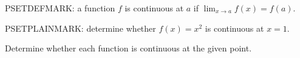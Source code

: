 \documentclass[
	pset-number = 3,
	pset-due    = {Friday, May 15, 2026},
]{pset}
\begin{document}
\maketitle

\begin{definition}[Continuity]
	PSETDEFMARK: a function $f$ is continuous at $a$ if
	$\lim_{x \to a} f(x) = f(a)$.
\end{definition}

\begin{problem}[10]
	PSETPLAINMARK: determine whether $f(x) = x^2$ is continuous at $x = 1$.
\end{problem}

\begin{problem}[10]
	Determine whether each function is continuous at the given point.
\end{problem}
\end{document}
